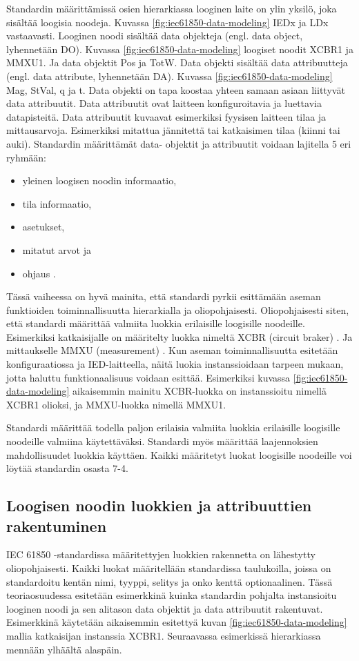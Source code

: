 Standardin määrittämissä osien hierarkiassa looginen laite on ylin yksilö, joka sisältää loogisia noodeja. Kuvassa \ref{fig:iec61850-data-modeling} IEDx ja LDx vastaavasti. Looginen noodi sisältää data objekteja (engl. data object, lyhennetään DO). Kuvassa \ref{fig:iec61850-data-modeling} loogiset noodit XCBR1 ja MMXU1. Ja data objektit Pos ja TotW. Data objekti sisältää data attribuutteja (engl. data attribute, lyhennetään DA). Kuvassa \ref{fig:iec61850-data-modeling} Mag, StVal, q ja t. Data objekti on tapa koostaa yhteen samaan asiaan liittyvät data attribuutit. Data attribuutit ovat laitteen konfiguroitavia ja luettavia datapisteitä. Data attribuutit kuvaavat esimerkiksi fyysisen laitteen tilaa ja mittausarvoja. Esimerkiksi mitattua jännitettä tai katkaisimen tilaa (kiinni tai auki). Standardin määrittämät data- objektit ja attribuutit voidaan lajitella 5 eri ryhmään:
\begin{itemize}
	\item yleinen loogisen noodin informaatio,
	\item tila informaatio,
	\item asetukset,
	\item mitatut arvot ja
	\item ohjaus \cite[s.~25]{IEC61850-1}.
\end{itemize}

Tässä vaiheessa on hyvä mainita, että standardi pyrkii esittämään aseman funktioiden toiminnallisuutta hierarkialla ja oliopohjaisesti. Oliopohjaisesti siten, että standardi määrittää valmiita luokkia erilaisille loogisille noodeille. Esimerkiksi katkaisijalle on määritelty luokka nimeltä XCBR (circuit braker) \cite[s.~105--106]{IEC61850-7-4}. Ja mittaukselle MMXU (measurement) \cite[s.~57--58]{IEC61850-7-4}. Kun aseman toiminnallisuutta esitetään konfiguraatiossa ja IED-laitteella, näitä luokia instanssioidaan tarpeen mukaan, jotta haluttu funktionaalisuus voidaan esittää. Esimerkiksi kuvassa \ref{fig:iec61850-data-modeling} aikaisemmin mainitu XCBR-luokka on instanssioitu nimellä XCBR1 olioksi, ja MMXU-luokka nimellä MMXU1.

Standardi määrittää todella paljon erilaisia valmiita luokkia erilaisille loogisille noodeille valmiina käytettäväksi. Standardi myös määrittää laajennoksien mahdollisuudet luokkia käyttäen. Kaikki määritetyt luokat loogisille noodeille voi löytää standardin osasta 7-4.


\subsection{Loogisen noodin luokkien ja attribuuttien rakentuminen}
IEC 61850 -standardissa määritettyjen luokkien rakennetta on lähestytty oliopohjaisesti. Kaikki luokat määritellään standardissa taulukoilla, joissa on standardoitu kentän nimi, tyyppi, selitys ja onko kenttä optionaalinen. Tässä teoriaosuudessa esitetään esimerkkinä kuinka standardin pohjalta instansioitu looginen noodi ja sen alitason data objektit ja data attribuutit rakentuvat. Esimerkkinä käytetään aikaisemmin esitettyä kuvan \ref{fig:iec61850-data-modeling} mallia katkaisijan instanssia XCBR1. Seuraavassa esimerkissä hierarkiassa mennään ylhäältä alaspäin.

